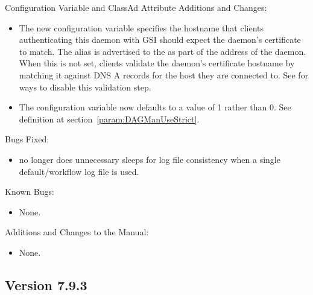 \noindent Configuration Variable and ClassAd Attribute Additions and Changes:

\begin{itemize}

\item The new configuration variable  specifies the
  hostname that clients authenticating this daemon with GSI should
  expect the daemon's certificate to match.  The alias is advertised
  to the  as part of the address of the daemon.
  When this is not set, clients validate the daemon's certificate
  hostname by matching it against DNS A records for the host they
  are connected to.  See  for ways
  to disable this validation step.

\item The configuration variable  now
defaults to a value of 1 rather than 0.
See definition at section~\ref{param:DAGManUseStrict}.

\end{itemize}

\noindent Bugs Fixed:

\begin{itemize}

\item {} no longer does unnecessary sleeps for log file
consistency when a single default/workflow log file is used.

\end{itemize}

\noindent Known Bugs:

\begin{itemize}

\item None.

\end{itemize}

\noindent Additions and Changes to the Manual:

\begin{itemize}

\item None.

\end{itemize}

\subsection*{\label{sec:New-7-9-3}Version 7.9.3}

